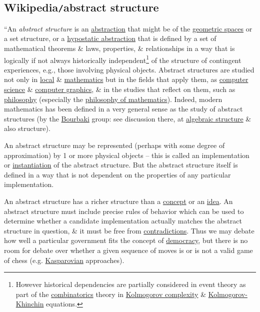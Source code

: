 \documentclass{article}
\begin{document}
\subsection{Wikipedia{\tt/}abstract structure}
``An {\it abstract structure} is an \href{https://en.wikipedia.org/wiki/Abstraction}{abstraction} that might be of the \href{https://en.wikipedia.org/wiki/Euclidean_space}{geometric spaces} or a set structure, or a \href{https://en.wikipedia.org/wiki/Hypostatic_abstraction}{hypostatic abstraction} that is defined by a set of mathematical theorems \& laws, properties, \& relationships in a way that is logically if not always historically independent\footnote{However historical dependencies are partially considered in event theory as part of the \href{https://en.wikipedia.org/wiki/Combinatorics}{combinatorics} theory in \href{https://en.wikipedia.org/wiki/Kolmogorov_complexity}{Kolmogorov complexity} \& \href{https://en.wikipedia.org/wiki/Wiener-Khinchin_theorem}{Kolmogorov-Khinchin} equations.} of the structure of contingent experiences, e.g., those involving physical objects. Abstract structures are studied not only in \href{https://en.wikipedia.org/wiki/Logic}{local} \& \href{https://en.wikipedia.org/wiki/Mathematics}{mathematics} but in the fields that apply them, as \href{https://en.wikipedia.org/wiki/Computer_science}{computer science} \& \href{https://en.wikipedia.org/wiki/Computer_graphics}{computer graphics}, \& in the studies that reflect on them, such as \href{https://en.wikipedia.org/wiki/Philosophy}{philosophy} (especially the \href{https://en.wikipedia.org/wiki/Philosophy_of_mathematics}{philosophy of mathematics}). Indeed, modern mathematics has been defined in a very general sense as the study of abstract structures (by the \href{https://en.wikipedia.org/wiki/Nicolas_Bourbaki}{Bourbaki} group: see discussion there, at \href{https://en.wikipedia.org/wiki/Algebraic_structure}{algebraic structure} \& also structure).

An abstract structure may be represented (perhaps with some degree of approximation) by 1 or more physical objects -- this is called an implementation or \href{https://en.wikipedia.org/wiki/Instantiation_principle}{instantiation} of the abstract structure. But the abstract structure itself is defined in a way that is not dependent on the properties of any particular implementation.

An abstract structure has a richer structure than a \href{https://en.wikipedia.org/wiki/Concept}{concept} or an \href{https://en.wikipedia.org/wiki/Idea}{idea}. An abstract structure must include precise rules of behavior which can be used to determine whether a candidate implementation actually matches the abstract structure in question, \& it must be free from \href{https://en.wikipedia.org/wiki/Contradiction}{contradictions}. Thus we may debate how well a particular government fits the concept of \href{https://en.wikipedia.org/wiki/Democracy}{democracy}, but there is no room for debate over whether a given sequence of moves is or is not a valid game of chess (e.g. \href{https://en.wikipedia.org/wiki/Kasparov}{Kasparovian} approaches).
\end{document}
